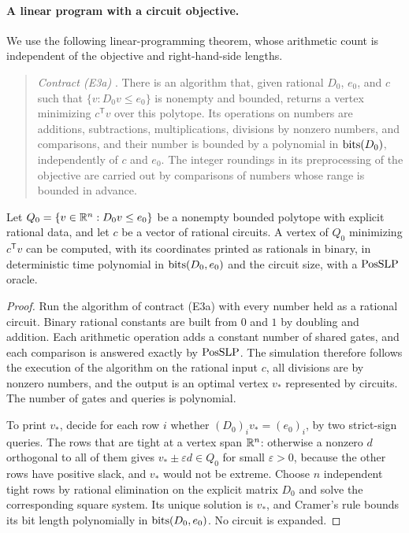 \paragraph{A linear program with a circuit objective.}
We use the following linear-programming theorem, whose arithmetic count is
independent of the objective and right-hand-side lengths.

\begin{quote}
\emph{Contract (E3a)}
\citep[Theorem~6.6.3]{GroetschelLovaszSchrijver1988}. There is an algorithm
that, given rational $D_0$, $e_0$, and $c$ such that
$\{v:D_0v\le e_0\}$ is nonempty and bounded, returns a vertex minimizing
$c^{\mathsf T}v$ over this polytope. Its operations on numbers are additions,
subtractions, multiplications, divisions by nonzero numbers, and comparisons,
and their number is bounded by a polynomial in $\operatorname{bits}(D_0)$, independently of
$c$ and $e_0$. The integer roundings in its preprocessing of the objective are
carried out by comparisons of numbers whose range is bounded in advance.
\end{quote}

\begin{lemma}
\label{lem:constraints-circuit-lp}
Let $Q_0=\{v\in\mathbb R^n:D_0v\le e_0\}$ be a nonempty bounded polytope with
explicit rational data, and let $c$ be a vector of rational circuits. A vertex
of $Q_0$ minimizing $c^{\mathsf T}v$ can be computed, with its coordinates
printed as rationals in binary, in deterministic time polynomial in
$\operatorname{bits}(D_0,e_0)$ and the circuit size, with a $\mathrm{PosSLP}$ oracle.
\end{lemma}

\begin{proof}
Run the algorithm of contract (E3a) with every number held as a rational
circuit. Binary rational constants are built from $0$ and $1$ by doubling and
addition. Each arithmetic operation adds a constant number of shared gates,
and each comparison is answered exactly by $\mathrm{PosSLP}$. The simulation therefore
follows the execution of the algorithm on the rational input $c$, all
divisions are by nonzero numbers, and the output is an optimal vertex
$v_*$ represented by circuits. The number of gates and queries is polynomial.

To print $v_*$, decide for each row $i$ whether $(D_0)_iv_*=(e_0)_i$, by two
strict-sign queries. The rows that are tight at a vertex span $\mathbb R^n$:
otherwise a nonzero $d$ orthogonal to all of them gives
$v_*\pm\varepsilon d\in Q_0$ for small $\varepsilon>0$, because the other rows
have positive slack, and $v_*$ would not be extreme. Choose $n$ independent
tight rows by rational elimination on the explicit matrix $D_0$ and solve the
corresponding square system. Its unique solution is $v_*$, and Cramer's rule
bounds its bit length polynomially in $\operatorname{bits}(D_0,e_0)$. No circuit is
expanded.
\end{proof}

